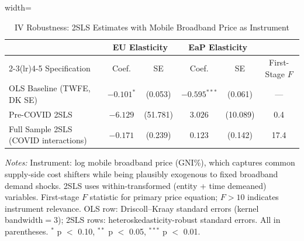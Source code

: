 \begin{table}[htbp]
\centering
\caption{IV Robustness: 2SLS Estimates with Mobile Broadband Price as Instrument}
\label{tab:iv_robustness}
\begin{minipage}{\textwidth}
\begin{adjustbox}{width=\textwidth}
\scriptsize
\begin{tabular}{lccccc}
\toprule
& \multicolumn{2}{c}{EU Elasticity} & \multicolumn{2}{c}{EaP Elasticity} & \\
\cmidrule(lr){2-3}\cmidrule(lr){4-5}
Specification & Coef. & SE & Coef. & SE & First-Stage $F$ \\
\midrule
OLS Baseline (TWFE, DK SE) & $-0.101^{*}$ & (0.053) & $-0.595^{***}$ & (0.061) & --- \\[2pt]
Pre-COVID 2SLS & $-6.129$ & (51.781) & $3.026$ & (10.089) & 0.4 \\[2pt]
Full Sample 2SLS (COVID interactions) & $-0.171$ & (0.239) & $0.123$ & (0.142) & 17.4 \\[2pt]
\bottomrule
\end{tabular}
\end{adjustbox}
\par\vspace{4pt}
\scriptsize
\textit{Notes:} Instrument: log mobile broadband price (GNI\%), which captures
common supply-side cost shifters while being plausibly exogenous to fixed broadband
demand shocks. 2SLS uses within-transformed (entity + time demeaned) variables.
First-stage $F$ statistic for primary price equation; $F > 10$ indicates instrument
relevance. OLS row: Driscoll--Kraay standard errors (kernel bandwidth$=$3);
2SLS rows: heteroskedasticity-robust standard errors. All in parentheses.
$^{*}$ p $<$ 0.10, $^{**}$ p $<$ 0.05, $^{***}$ p $<$ 0.01.
\end{minipage}
\end{table}
